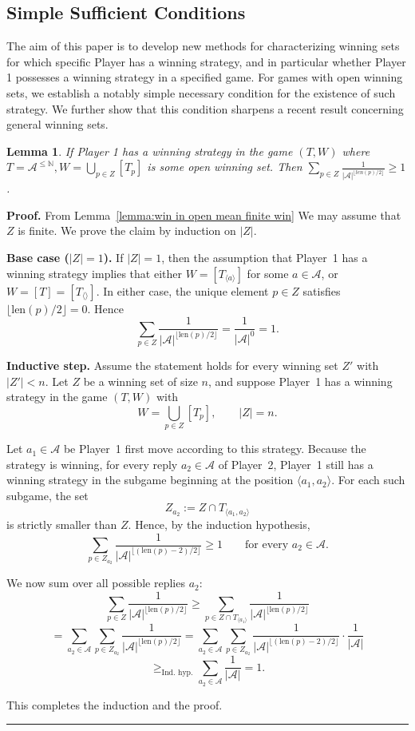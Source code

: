 \documentclass[a4,12pt]{article}%
\newtheorem{lemma}[theorem]{Lemma}
\newenvironment{proof}[1][Proof]{\textbf{#1.} }{\ \rule{0.5em}{0.5em}}
\newcommand{\N}{\mathbb{N}}
\begin{document}
\subsection{Simple Sufficient Conditions}
The aim of this paper is to develop new methods for characterizing winning sets for which specific Player has a winning strategy, and in particular whether Player 1 possesses a winning strategy in a specified game. For games with open winning sets, we establish a notably simple necessary condition for the existence of such strategy. We further show that this condition sharpens a recent result concerning general winning sets.
\begin{lemma} \label{lemma: necceserry open condition lengths}
    If Player 1 has a winning strategy in the game $(T,W)$ where $T= \mathcal{A}^{\leq \N} , W= \bigcup _ {p \in Z } [T_p] $ is some open winning set. Then $\sum_{p \in Z} \frac{1}{|\mathcal{A}|^{\lfloor {len(p)/2} \rfloor}} \geq 1$.
\end{lemma}
\begin{proof}
    From Lemma~\ref{lemma:win in open mean finite win} We may assume that $Z$ is finite. We prove the claim by induction on \(|Z|\). 

\textbf{Base case (\(|Z|=1\)).}
If \(|Z|=1\), then the assumption that Player~1 has a winning strategy implies that either
\(W=[T_{\langle a\rangle}]\) for some \(a\in\mathcal A\), or \(W=[T]=[T_{\langle\rangle}]\).
In either case, the unique element \(p\in Z\) satisfies \(\lfloor \mathrm{len}(p)/2\rfloor = 0\). Hence
\[
\sum_{p\in Z} \frac{1}{|\mathcal A|^{\lfloor \mathrm{len}(p)/2\rfloor}}
= \frac{1}{|\mathcal A|^{0}} = 1.
\]

\textbf{Inductive step.}
Assume the statement holds for every winning set \(Z'\) with \(|Z'|<n\).
Let \(Z\) be a winning set of size \(n\), and suppose Player~1 has a winning strategy in the game \((T,W)\) with
\[
W = \bigcup_{p\in Z} [T_p], \qquad |Z| = n.
\]

Let \(a_1\in\mathcal A\) be Player~1 first move according to this strategy.
Because the strategy is winning, for every reply \(a_2\in\mathcal A\) of Player~2, Player~1 still has a winning strategy in the subgame beginning at the position \(\langle a_1,a_2\rangle\).
For each such subgame, the set
\[
Z_{a_2} := Z \cap T_{\langle a_1,a_2\rangle}
\]
is strictly smaller than \(Z\).
Hence, by the induction hypothesis,
\[
\sum_{p\in Z_{a_2}}
   \frac{1}{|\mathcal A|^{\lfloor (\mathrm{len}(p)-2)/2 \rfloor}}
   \ge 1
   \qquad \text{for every } a_2\in\mathcal A.
\]

We now sum over all possible replies \(a_2\):
\[
\sum_{p\in Z}
   \frac{1}{|\mathcal A|^{\lfloor \mathrm{len}(p)/2\rfloor}}
   \ge
   \sum_{p\in Z\cap T_{\langle a_1\rangle}}
   \frac{1}{|\mathcal A|^{\lfloor \mathrm{len}(p)/2\rfloor}}
\]
\[
=
\sum_{a_2\in\mathcal A}
   \sum_{p\in Z_{a_2}}
   \frac{1}{|\mathcal A|^{\lfloor \mathrm{len}(p)/2\rfloor}}
=
\sum_{a_2\in\mathcal A}
   \sum_{p\in Z_{a_2}}
   \frac{1}{|\mathcal A|^{\lfloor (\mathrm{len}(p)-2)/2\rfloor}}
   \cdot
   \frac{1}{|\mathcal A|}
\]
\[
\ge_{\text{Ind.\ hyp.}}
\sum_{a_2\in\mathcal A}
   \frac{1}{|\mathcal A|}
= 1.
\]

This completes the induction and the proof.
\end{proof}
\end{document}
